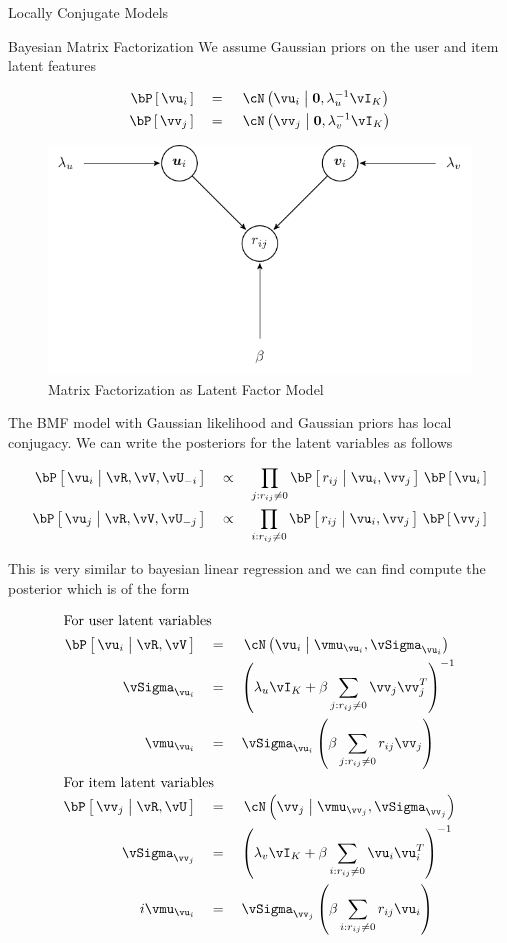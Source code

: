 \documentclass{article}
\begin{document}
\begin{ssection}{Locally Conjugate Models}
\begin{ssubsection}{Bayesian Matrix Factorization}
		We assume Gaussian priors on the user and item latent features

		\begin{align*}
			\prob{\vu_i}	&\eq \ND{\vu_i \pipe \vzero, \lambda_u^{-1} \vI_{K}} \\
			\prob{\vv_j}	&\eq \ND{\vv_j \pipe \vzero, \lambda_v^{-1} \vI_{K}}
		\end{align*} \br%

		\begin{figure}[h!]
			\centering
			\includegraphics{includes/sampling-methods/matrix-factorization.pdf}
			\caption{Matrix Factorization as Latent Factor Model}
		\end{figure}

		The BMF model with Gaussian likelihood and Gaussian priors has local conjugacy. We can write the posteriors for the latent variables as follows

		\begin{align*}
			\prob{\vu_i \pipe \vR, \vV, \vU_{-i}}	&\qprop \prod_{j : r_{ij} \ne 0} \prob{r_{ij} \pipe \vu_i, \vv_j} \, \prob{\vu_i} \\
			\prob{\vu_j \pipe \vR, \vV, \vU_{-j}}	&\qprop \prod_{i : r_{ij} \ne 0} \prob{r_{ij} \pipe \vu_i, \vv_j} \, \prob{\vv_j}
		\end{align*} \br%

		This is very similar to bayesian linear regression and we can find compute the posterior which is of the form

		\begin{align*}
			\shortintertext{For user latent variables}
			\prob{\vu_i \pipe \vR, \vV}		&\eq \ND{\vu_i \pipe \vmu_{\vu_i}, \vSigma_{\vu_i}} \\
			\vSigma_{\vu_i}					&\eq \para{\lambda_u \vI_{K} + \beta \sum_{j : r_{ij} \ne 0} \vv_j \vv_j^T}^{-1} \\
			\vmu_{\vu_i}					&\eq \vSigma_{\vu_i} \para{\beta \sum_{j : r_{ij} \ne 0} r_{ij} \vv_j} \\
			\shortintertext{For item latent variables}
			\prob{\vv_j \pipe \vR, \vU}		&\eq \ND{\vv_j \pipe \vmu_{\vv_j}, \vSigma_{\vv_j}} \\
			\vSigma_{\vv_j}					&\eq \para{\lambda_v \vI_{K} + \beta \sum_{i : r_{ij} \ne 0} \vu_i \vu_i^T}^{-1} \\i
			\vmu_{\vu_i}					&\eq \vSigma_{\vv_j} \para{\beta \sum_{i : r_{ij} \ne 0} r_{ij} \vu_i}
		\end{align*} \br


\end{ssubsection}
\end{ssection}
\end{document}
